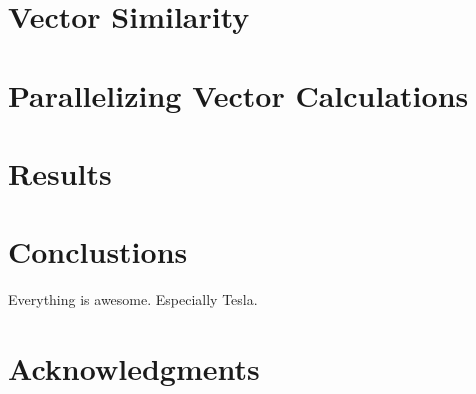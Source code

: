 \documentclass[12pt]{article}
\begin{document}
\section{Vector Similarity}

\section{Parallelizing Vector Calculations}

\section{Results}

\section{Conclustions}
Everything is awesome. Especially Tesla.

\section{Acknowledgments}

\end{document}
